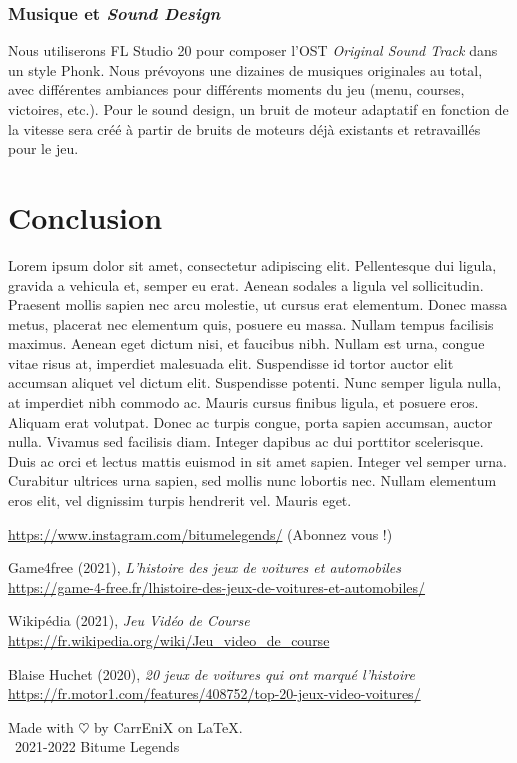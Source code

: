 \documentclass[11pt,a4paper]{article}
\begin{document}
    \subsubsection{Musique et \textit{Sound Design}}
      Nous utiliserons FL Studio 20 pour composer l'OST \textit{Original Sound Track} dans un style Phonk.
      Nous prévoyons une dizaines de musiques originales au total, avec différentes ambiances pour
      différents moments du jeu (menu, courses, victoires, etc.). Pour le sound design, un bruit de 
      moteur adaptatif en fonction de la vitesse sera créé à partir de bruits de moteurs déjà 
      existants et retravaillés pour le jeu.
\clearpage

\section{Conclusion}
  Lorem ipsum dolor sit amet, consectetur adipiscing elit. Pellentesque dui ligula, gravida a vehicula et, 
  semper eu erat. Aenean sodales a ligula vel sollicitudin. Praesent mollis sapien nec arcu molestie, ut 
  cursus erat elementum. Donec massa metus, placerat nec elementum quis, posuere eu massa. Nullam tempus 
  facilisis maximus. Aenean eget dictum nisi, et faucibus nibh. Nullam est urna, congue vitae risus at, 
  imperdiet malesuada elit. Suspendisse id tortor auctor elit accumsan aliquet vel dictum elit. Suspendisse 
  potenti. Nunc semper ligula nulla, at imperdiet nibh commodo ac. Mauris cursus finibus ligula, et posuere eros.
  Aliquam erat volutpat. Donec ac turpis congue, porta sapien accumsan, auctor nulla. Vivamus sed facilisis 
  diam. Integer dapibus ac dui porttitor scelerisque. Duis ac orci et lectus mattis euismod in sit amet sapien. 
  Integer vel semper urna. Curabitur ultrices urna sapien, sed mollis nunc lobortis nec. Nullam elementum eros 
  elit, vel dignissim turpis hendrerit vel. Mauris eget.

\begin{thebibliography}{9}
    \url{https://www.instagram.com/bitumelegends/} (Abonnez vous !)
  
    Game4free (2021), \emph{L'histoire des jeux de voitures et automobiles}\\
    \url{https://game-4-free.fr/lhistoire-des-jeux-de-voitures-et-automobiles/}

    Wikipédia (2021), \emph{Jeu Vidéo de Course} \\
    \url{https://fr.wikipedia.org/wiki/Jeu_video_de_course}

    Blaise Huchet (2020), \emph{20 jeux de voitures qui ont marqué l'histoire}\\
    \url{https://fr.motor1.com/features/408752/top-20-jeux-video-voitures/}

\end{thebibliography}

Made with $\heartsuit$ by CarrEniX on \LaTeX.\\
\textcopyright\, 2021-2022 Bitume Legends
\end{document}

